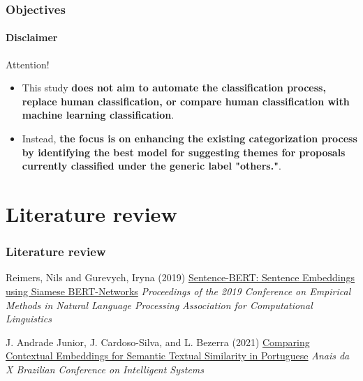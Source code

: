 \begin{frame}
	\frametitle{Objectives}
	\framesubtitle{Disclaimer}
		
	\begin{alertblock}{Attention!} 
		\begin{itemize}
			\item This study \textbf{does not aim to automate the classification process, replace human classification, or compare human classification with machine learning classification}. 
			
			\item Instead, \textbf{the focus is on enhancing the existing categorization process by identifying the best model for suggesting themes for proposals currently classified under the generic label "others."}.
		\end{itemize}
	\end{alertblock}
	
	
	
\end{frame}





\section{Literature review}
\begin{frame}
	\frametitle{Literature review}
	
	\begin{thebibliography}{99} %
	\footnotesize %
		\scriptsize
	
		Reimers, Nils and Gurevych, Iryna (2019)
		\newblock \href{http://arxiv.org/abs/1908.10084}{Sentence-BERT: Sentence Embeddings using Siamese BERT-Networks}
		\newblock \emph{Proceedings of the 2019 Conference on Empirical Methods in Natural Language Processing} 
		\newblock \emph{Association for Computational Linguistics} 
		
		J. Andrade Junior, J. Cardoso-Silva, and L. Bezerra (2021)
		\newblock \href{https://core.ac.uk/download/491169432.pdf}{Comparing Contextual Embeddings for	Semantic Textual Similarity in Portuguese}
		\newblock \scriptsize \emph{Anais da X Brazilian Conference on Intelligent Systems} 
		
		\normalsize		 

	\end{thebibliography}

	
	
\end{frame}
